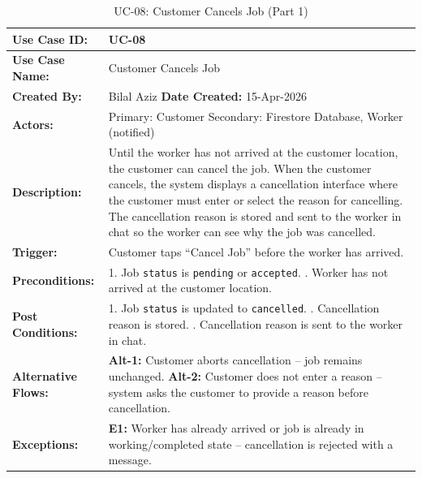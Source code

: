 {\small
\renewcommand{\arraystretch}{1.05}
\begin{table}[H]
\centering
\begin{tabular}{|p{3cm}|p{11.2cm}|}
\hline
\textbf{Use Case ID:} & UC-08 \\ \hline
\textbf{Use Case Name:} & Customer Cancels Job\\ \hline
\textbf{Created By:} & Bilal Aziz \hfill \textbf{Date Created:} 15-Apr-2026 \\ \hline
\textbf{Actors:} & Primary: Customer \quad Secondary: Firestore Database, Worker (notified) \\ \hline
\textbf{Description:} & Until the worker has not arrived at the customer location, the customer can cancel the job. When the customer cancels, the system displays a cancellation interface where the customer must enter or select the reason for cancelling. The cancellation reason is stored and sent to the worker in chat so the worker can see why the job was cancelled. \\ \hline
\textbf{Trigger:} & Customer taps ``Cancel Job'' before the worker has arrived. \\ \hline
\textbf{Preconditions:} & 1. Job \texttt{status} is \texttt{pending} or \texttt{accepted}. \newline 2. Worker has not arrived at the customer location. \\ \hline
\textbf{Post Conditions:} & 1. Job \texttt{status} is updated to \texttt{cancelled}. \newline 2. Cancellation reason is stored. \newline 3. Cancellation reason is sent to the worker in chat. \\ \hline
\textbf{Alternative Flows:} & \textbf{Alt-1:} Customer aborts cancellation -- job remains unchanged. \newline \textbf{Alt-2:} Customer does not enter a reason -- system asks the customer to provide a reason before cancellation. \\ \hline
\textbf{Exceptions:} & \textbf{E1:} Worker has already arrived or job is already in working/completed state -- cancellation is rejected with a message. \\ \hline
\end{tabular}
\caption*{UC-08: Customer Cancels Job (Part 1)}
\end{table}
}

\newpage

